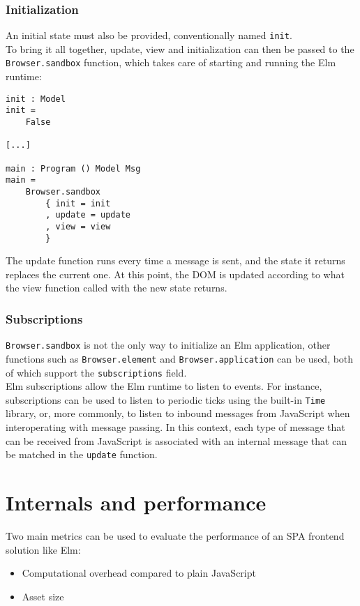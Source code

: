\subsubsection{Initialization}
An initial state must also be provided, conventionally named \texttt{init}.\\
To bring it all together, update, view and initialization can then be passed to the \texttt{Browser.sandbox} function, which takes care of starting and running the Elm runtime:
\begin{verbatim}
init : Model
init =
    False

[...]

main : Program () Model Msg
main =
    Browser.sandbox
        { init = init
        , update = update
        , view = view
        }
\end{verbatim}

The update function runs every time a message is sent, and the state it returns replaces the current one. At this point, the DOM is updated according to what the view function called with the new state returns.

\subsubsection{Subscriptions}

\texttt{Browser.sandbox} is not the only way to initialize an Elm application, other functions such as \texttt{Browser.element} and \texttt{Browser.application} can be used, both of which support the \texttt{subscriptions} field.\\

Elm subscriptions allow the Elm runtime to listen to events. For instance, subscriptions can be used to listen to periodic ticks using the built-in \texttt{Time} library, or, more commonly, to listen to inbound messages from JavaScript when interoperating with message passing. In this context, each type of message that can be received from JavaScript is associated with an internal message that can be matched in the \texttt{update} function.

\section{Internals and performance}
Two main metrics can be used to evaluate the performance of an SPA frontend solution like Elm:
\begin{itemize}
    \item Computational overhead compared to plain JavaScript
    \item Asset size
\end{itemize}

